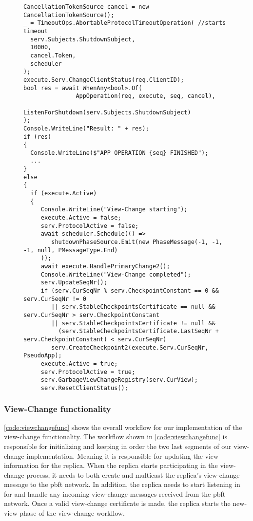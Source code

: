 \begin{figure}[H]
	\centering
	\begin{lstlisting}[label = code:timeout, caption=Handling timeout for the normal protocol workflow and initiate the View-Change process, captionpos = b, basicstyle=\scriptsize]
CancellationTokenSource cancel = new CancellationTokenSource();
_ = TimeoutOps.AbortableProtocolTimeoutOperation( //starts timeout
  serv.Subjects.ShutdownSubject,
  10000,
  cancel.Token,
  scheduler
);
execute.Serv.ChangeClientStatus(req.ClientID);
bool res = await WhenAny<bool>.Of(
               AppOperation(req, execute, seq, cancel),
               ListenForShutdown(serv.Subjects.ShutdownSubject)
);
Console.WriteLine("Result: " + res);
if (res)
{
  Console.WriteLine($"APP OPERATION {seq} FINISHED");
  ...
}
else
{
  if (execute.Active)
  {
     Console.WriteLine("View-Change starting");
     execute.Active = false;
     serv.ProtocolActive = false;
     await scheduler.Schedule(() =>
        shutdownPhaseSource.Emit(new PhaseMessage(-1, -1, -1, null, PMessageType.End)
     ));
     await execute.HandlePrimaryChange2();
     Console.WriteLine("View-Change completed");
     serv.UpdateSeqNr();
     if (serv.CurSeqNr % serv.CheckpointConstant == 0 && serv.CurSeqNr != 0
        || serv.StableCheckpointsCertificate == null && serv.CurSeqNr > serv.CheckpointConstant
        || serv.StableCheckpointsCertificate != null &&
          (serv.StableCheckpointsCertificate.LastSeqNr + serv.CheckpointConstant) < serv.CurSeqNr)
        serv.CreateCheckpoint2(execute.Serv.CurSeqNr, PseudoApp);
     execute.Active = true;
     serv.ProtocolActive = true;
     serv.GarbageViewChangeRegistry(serv.CurView);
     serv.ResetClientStatus();
   \end{lstlisting}
\end{figure}


\subsubsection{View-Change functionality}
\autoref{code:viewchangefunc} shows the overall workflow for our implementation of the view-change functionality.  The workflow shown in \autoref{code:viewchangefunc} is responsible for initializing and keeping in order the two last segments of our view-change implementation.  Meaning it is responsible for updating the view information for the replica.  
When the replica starts participating in the view-change process, it needs to both create and multicast the replica’s view-change message to the \ac{pbft} network. In addition, the replica needs to start listening in for and handle any incoming view-change messages received from the \ac{pbft} network. Once a valid view-change certificate is made, the replica starts the new-view phase of the view-change workflow. 

